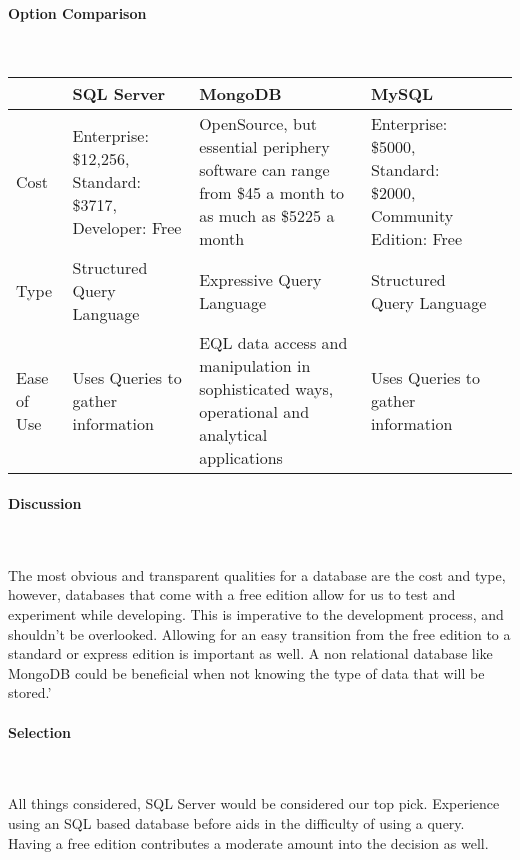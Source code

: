 \documentclass[letterpaper, 10pt, draftclsnofoot, compsoc, onecolumn]{IEEEtran}
\begin{document}
{{ \par}


\newpage
\paragraph{Option Comparison} ~\\
\tablehead{}
\begin{supertabular}{|p{2cm}|p{2.5cm}|p{2.5cm}|p{2.5cm}|p{2.5cm}|}
\hline & SQL Server & MongoDB & MySQL\\ \hline
Cost & Enterprise: \$12,256, Standard: \$3717, Developer: Free & OpenSource, but essential periphery software can range from \$45 a month to as much as \$5225 a month & Enterprise: \$5000, Standard: \$2000, Community Edition: Free \\ \hline
Type & Structured Query Language & Expressive Query Language & Structured Query Language\\ \hline
Ease of Use & Uses Queries to gather information & EQL data access and manipulation in sophisticated ways, operational and analytical applications \cite{ibmbpnetwork} & Uses Queries to gather information \\ \hline
\end{supertabular}

\newpage
\paragraph{Discussion} ~\\
{\noindent The most obvious and transparent qualities for a database are the cost and type, however, databases that come with a free edition allow for us to test and experiment while developing. This is imperative to the development process, and shouldn't be overlooked. Allowing for an easy transition from the free edition to a standard or express edition is important as well. A non relational database like MongoDB could be beneficial when not knowing the type of data that will be stored.' \par}

\medskip
\paragraph{Selection} ~\\
{\noindent All things considered, SQL Server would be considered our top pick. Experience using an SQL based database before aids in the difficulty of using a query. Having a free edition contributes a moderate amount into the decision as well.\par}

}
\end{document}
